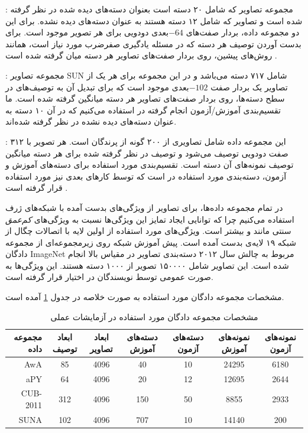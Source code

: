 \textbf{}\cite{farhadi09}:
مجموعه تصاویر
  \cite{pascal}
 که شامل ۲۰ دسته است بعنوان دسته‌های دیده شده در نظر گرفته شده است و تصاویر  که شامل ۱۲ دسته هستند به عنوان دسته‌های دیده نشده. برای این دو مجموعه داده، بردار صفت‌های $-64$بعدی دودویی برای هر تصویر موجود است. برای بدست آوردن توصیف هر دسته که در مسئله یادگیری صفرضرب مورد نیاز است، همانند روش‌های پیشین، روی بردار صفت‌های تصاویر هر دسته میان گرفته
 شده است  \cite{lampert09}.


\textbf{} \cite{sun}:
مجموعه تصاویر SUN شامل ۷۱۷ دسته می‌باشد و در این مجموعه برای هر یک از تصاویر یک بردار صفت $-102$بعدی موجود است که برای تبدیل آن به توصیف‌های در سطح دسته‌ها، روی بردار صفت‌های تصاویر هر دسته میانگین گرفته شده است. ما تقسیم‌بندی آموزش/آزمون انجام گرفته در \cite{jayaraman14} استفاده می‌کنیم که در آن ۱۰ دسته به عنوان دسته‌های دیده نشده در نظر گرفته شده‌اند.

\textbf{} \cite{cub}:
این مجموعه داده شامل تصاویری از ۲۰۰ گونه از پرندگان است. هر تصویر با ۳۱۲ صفت دودویی توصیف می‌شود و توصیف در نظر گرفته شده برای هر دسته میانگین توصیف نمونه‌های آن دسته است. تقسیم‌بندی مورد استفاده برای دسته‌های آموزش و آزمون، دسته‌بندی مورد استفاده در \cite{akata13} است که توسط کارهای بعدی نیز مورد استفاده قرار گرفته است
\cite{sse, Akata2015, Reed2016}.


در تمام مجموعه داده‌ها، برای تصاویر از ویژگی‌های بدست آمده با شبکه‌های ژرف استفاده می‌کنیم چرا که توانایی ایجاد تمایز این ویژگی‌ها نسبت به ویژگی‌های
\textit{کم‌عمق}
سنتی مانند   و   بیشتر است.
ویژگی‌های مورد استفاده از  اولین لایه با اتصالات چگال از شبکه ۱۹ لایه‌ی  \cite{vgg} بدست آمده است. پیش آموزش شبکه  روی زیرمجموعه‌ای از
مجموعه دادگان ImageNet
\cite{imagenet}
مربوط به چالش سال ۲۰۱۲ دسته‌بندی تصاویر در مقیاس بالا
 \cite{ILSVRC15} انجام شده است.
 این تصاویر شامل ۱۵۰۰۰۰ تصویر از ۱۰۰۰ دسته هستند.
 این ویژگی‌ها به صورت عمومی توسط نویسندگان
\cite{sse}
در اختیار قرار گرفته است.

مشخصات مجموعه دادگان مورد استفاده به صورت خلاصه در جدول \ref{tab:datasets} آمده است.
\begin{center}

\begin{table}[ht]
\centering
\caption{مشخصات مجموعه دادگان مورد استفاده در آزمایشات عملی}
\vspace{2mm}
\label{tab:datasets}
\begin{tabular}{|r|c|c|c|c|c|c|}
\hline
 مجموعه داده & ابعاد توصیف‌ & ابعاد تصاویر &  دسته‌های آموزش & دسته‌های آزمون &  نمونه‌های آموزش &  نمونه‌های آزمون \\
\hline
AwA
& 85 & 4096 & 40 & 10 & 24295 & 6180 \\\hline
 aPY
& 64 & 4096 & 20 & 12 & 12695 & 2644 \\\hline
CUB-2011
& 312 & 4096 & 150 & 50 & 8855 & 2933 \\ \hline
 SUNA
& 102 & 4096 & 707 & 10 & 14140 & 200 \\
\hline
\end{tabular}
\end{table}
\end{center}
%
